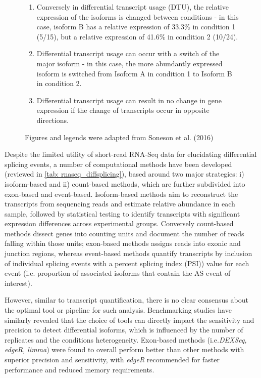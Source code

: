 \begin{figure}[htp]
{\begin{enumerate}[label=\textbf{\Alph*})]
		\item Conversely in differential transcript usage (DTU), the relative expression of the isoforms is changed between conditions - in this case, isoform B has a relative expression of 33.3\% in condition 1 (5/15), but a relative expression of 41.6\% in condition 2 (10/24).
		\item Differential transcript usage can occur with a switch of the major isoform - in this case, the more abundantly expressed isoform is switched from Isoform A in condition 1 to Isoform B in condition 2. 
		\item Differential transcript usage can result in no change in gene expression if the change of transcripts occur in opposite directions.
		\\
	\end{enumerate} 
	Figures and legends were adapted from Soneson et al. (2016)\cite{Soneson2016} 
   }
	\label{fig:dte_dtu_explanation}
\end{figure}

Despite the limited utility of short-read RNA-Seq data for elucidating differential splicing events, a number of computational methods have been developed (reviewed in \cref{tab: rnaseq_diffsplicing}), based around two major strategies: i) isoform-based and ii) count-based methods, which are further subdivided into exon-based and event-based. Isoform-based methods aim to reconstruct the transcripts from sequencing reads and estimate relative abundance in each sample, followed by statistical testing to identify transcripts with significant expression differences across experimental groups\cite{Mehmood2020}. Conversely count-based methods dissect genes into counting units and document the number of reads falling within those units\cite{Mehmood2020}; exon-based methods assigns reads into exonic and junction regions, whereas event-based methods quantify transcripts by inclusion of individual splicing events with a percent splicing index (PSI)) value for each event (i.e. proportion of associated isoforms that contain the AS event of interest). 

However, similar to transcript quantification, there is no clear consensus about the optimal tool or pipeline for such analysis. Benchmarking studies have similarly revealed that the choice of tools can directly impact the sensitivity and precision to detect differential isoforms, which is influenced by the number of replicates and the conditions heterogeneity\cite{Merino2019}. Exon-based methods (i.e.\textit{DEXSeq, edgeR, limma}) were found to overall perform better than other methods with superior precision and sensitivity, with \textit{edgeR} recommended for faster performance and reduced memory requirements\cite{Mehmood2020}. 


